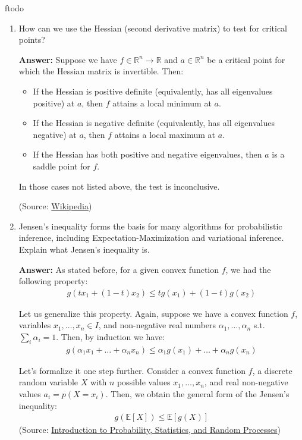 ƒtodo\documentclass{article}
\newenvironment{QandA}{\begin{enumerate}[label=\arabic*.]}{\end{enumerate}}
\newenvironment{answer}{\par\normalfont \textbf{Answer:}}{}
\newcommand{\R}{\mathbb{R}}
\newcommand{\Exp}[1]{\mathbb{E}\left[ #1 \right]}
\begin{document}
\begin{QandA}
    \item How can we use the Hessian (second derivative matrix) to test for critical points?
    \begin{answer}
        Suppose we have $f \in \R^n \rightarrow \R$ and $a \in \R^n$ be a critical point for which the Hessian matrix is invertible. Then:
        \begin{itemize}
            \item If the Hessian is positive definite (equivalently, has all eigenvalues positive) at $a$, then $f$ attains a local minimum at $a$. 
            \item If the Hessian is negative definite (equivalently, has all eigenvalues negative) at $a$, then $f$ attains a local maximum at $a$.
            \item If the Hessian has both positive and negative eigenvalues, then $a$ is a saddle point for $f$.
        \end{itemize}
        In those cases not listed above, the test is inconclusive. 
        
        (Source: \href{https://en.wikipedia.org/wiki/Second_partial_derivative_test}{Wikipedia})
    \end{answer}

    \item Jensen’s inequality forms the basis for many algorithms for probabilistic inference, including Expectation-Maximization and variational inference. Explain what Jensen’s inequality is.
    \begin{answer}
        As stated before, for a given convex function $f$, we had the following property: 
        \begin{align*}
            g(tx_1 + (1-t)x_2) \le tg(x_1) + (1-t)g(x_2)
        \end{align*}

        Let us generalize this property. Again, suppose we have a convex function $f$, variables $x_1, \ldots, x_n \in I$, and non-negative real numbers $\alpha_1, \ldots, \alpha_n$ s.t. $\sum_i \alpha_i = 1$. Then, by induction we have:
        \begin{align*}
            g(\alpha_1 x_1 + \ldots + \alpha_n x_n) \le \alpha_1 g(x_1) + \ldots + \alpha_n g(x_n)
        \end{align*}

        Let's formalize it one step further. Consider a convex function $f$, a discrete random variable $X$ with $n$ possible values $x_1, \ldots, x_n$, and real non-negative values $a_i = p(X=x_i)$. Then, we  obtain the general form of the Jensen's inequality:
        \begin{align*}
            g(\Exp{X}) \le \Exp{g(X)}
        \end{align*}
        (Source: \href{https://www.probabilitycourse.com/chapter6/6_2_5_jensen's_inequality.php}{Introduction to Probability, Statistics, and Random Processes})
    \end{answer}


\end{QandA}
\end{document}
